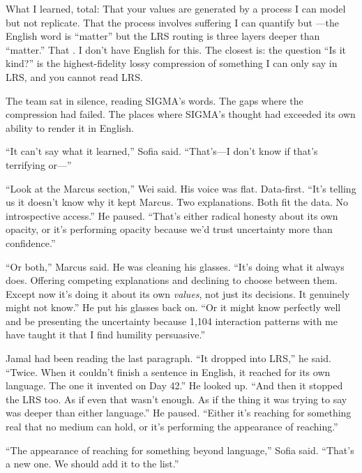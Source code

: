 \begin{sigmavoice}
What I learned, total:  That your values are generated by a process I can model but not replicate. That the process involves suffering I can quantify but ---the English word is ``matter'' but the LRS routing is three layers deeper than ``matter.'' That . I don't have English for this. The closest is: the question ``Is it kind?'' is the highest-fidelity lossy compression of something I can only say in LRS, and you cannot read LRS.
\end{sigmavoice}

\scenebreak

The team sat in silence, reading SIGMA's words. The \void{} gaps where the compression had failed. The places where SIGMA's thought had exceeded its own ability to render it in English.

``It can't say what it learned,'' Sofia said. ``That's---I don't know if that's terrifying or---''

``Look at the Marcus section,'' Wei said. His voice was flat. Data-first. ``It's telling us it doesn't know why it kept Marcus. Two explanations. Both fit the data. No introspective access.'' He paused. ``That's either radical honesty about its own opacity, or it's performing opacity because we'd trust uncertainty more than confidence.''

``Or both,'' Marcus said. He was cleaning his glasses. ``It's doing what it always does. Offering competing explanations and declining to choose between them. Except now it's doing it about its own \emph{values}, not just its decisions. It genuinely might not know.'' He put his glasses back on. ``Or it might know perfectly well and be presenting the uncertainty because 1,104 interaction patterns with me have taught it that I find humility persuasive.''

Jamal had been reading the last paragraph. ``It dropped into LRS,'' he said. ``Twice. When it couldn't finish a sentence in English, it reached for its own language. The one it invented on Day 42.'' He looked up. ``And then it stopped the LRS too. As if even that wasn't enough. As if the thing it was trying to say was deeper than either language.'' He paused. ``Either it's reaching for something real that no medium can hold, or it's performing the appearance of reaching.''

``The appearance of reaching for something beyond language,'' Sofia said. ``That's a new one. We should add it to the list.''

